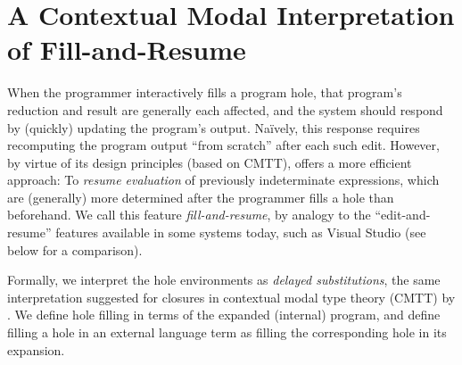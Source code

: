 



\newcommand{\commutativitySec}{A Contextual Modal Interpretation of Fill-and-Resume}
\section{\protect\commutativitySec}
\label{sec:resumption}



When the programmer interactively fills a program hole, that program's
reduction and result are generally each affected, and the system
should respond by (quickly) updating the program's output.
%
Na\"ively, this response requires recomputing the program output
``from scratch'' after each such edit.
%
However, by virtue of its design principles (based on
CMTT), \HazelnutLive offers a more efficient approach: To \emph{resume
evaluation} of previously indeterminate expressions, which are
(generally) more determined after the programmer fills a hole than
beforehand.
%
We call this feature \emph{fill-and-resume}, by analogy to the
``edit-and-resume'' features available in some systems today, such as
Visual Studio (see below for a comparison).

Formally, 
%
we interpret the hole environments as \emph{delayed substitutions},
the same interpretation suggested for closures in contextual modal
type theory (CMTT) by \citet{Nanevski2008}.
%
%
We define hole filling in terms of the expanded (internal) program,
and define filling a hole in an external language term as filling the
corresponding hole in its expansion.

